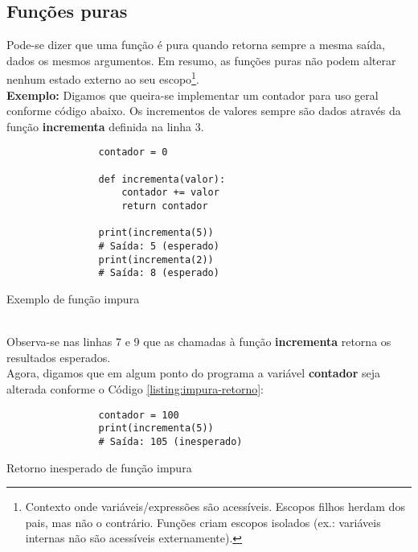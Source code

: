 \documentclass[date,twocolumn,a4paper]{ppgem}
\begin{document}
    \subsection{Funções puras}
        Pode-se dizer que uma função é pura quando retorna sempre a mesma saída, dados os mesmos argumentos\cite{queiroz_func_prog}. Em resumo, as funções
        puras não podem alterar nenhum estado externo ao seu escopo\footnote{Contexto onde variáveis/expressões são acessíveis. Escopos filhos herdam dos pais, mas não o contrário. Funções criam escopos isolados (ex.: variáveis internas não são acessíveis externamente)\cite{mdn_escopo}.}.\\
        \textbf{Exemplo:}
        Digamos que queira-se implementar um contador para uso geral conforme código abaixo. Os incrementos de valores sempre são dados através da função
        \textbf{incrementa} definida na linha 3.
        \begin{listing}[!ht]
            \begin{verbatim}
                contador = 0

                def incrementa(valor):
                    contador += valor
                    return contador

                print(incrementa(5))
                # Saída: 5 (esperado)
                print(incrementa(2))
                # Saída: 8 (esperado)
            \end{verbatim}
            \caption{Exemplo de função impura}
            \label{listing:impura}
        \end{listing}
        \\Observa-se nas linhas 7 e 9 que as chamadas à função \textbf{incrementa} retorna os resultados esperados.\\
        Agora, digamos que em algum ponto do programa a variável \textbf{contador} seja alterada conforme o
        Código \ref{listing:impura-retorno}:

        \begin{listing}[!ht]
            \begin{verbatim}
                contador = 100
                print(incrementa(5))
                # Saída: 105 (inesperado)
            \end{verbatim}
            \caption{Retorno inesperado de função impura}
            \label{listing:impura-retorno}
        \end{listing}\pagebreak
\end{document}
